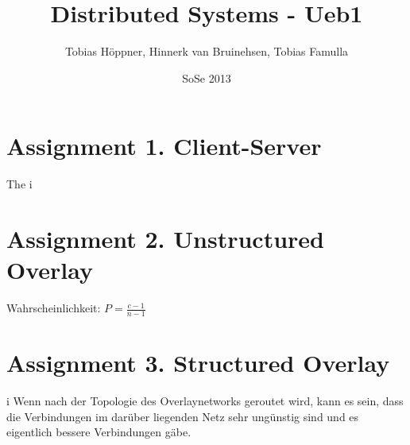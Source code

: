 \documentclass[ngerman,a4paper]{report}
\author{Tobias Höppner, Hinnerk van Bruinehsen, Tobias Famulla}
\title{Distributed Systems - Ueb1}
\date{SoSe 2013}
\renewcommand{\maketitle}{}
\begin{document}
\maketitle

\section*{Assignment 1. Client-Server}
The 
i

\section*{Assignment 2. Unstructured Overlay}
Wahrscheinlichkeit: $P = \frac{c-1}{n-1}$


\section*{Assignment 3. Structured Overlay}
i
Wenn nach der Topologie des Overlaynetworks geroutet wird, kann es sein, dass die Verbindungen im darüber liegenden Netz sehr ungünstig sind und es eigentlich bessere Verbindungen gäbe.
\end{document}
